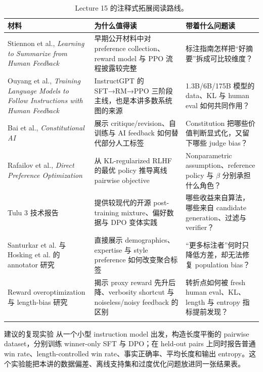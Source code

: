 \begin{longtable}{L{0.23\textwidth}L{0.31\textwidth}L{0.36\textwidth}}
\toprule
材料 & 为什么值得读 & 带着什么问题读 \\
\midrule
Stiennon et al., \emph{Learning to Summarize from Human Feedback} & 早期公开材料中对 preference collection、reward model 与 PPO 流程披露较完整 & 标注指南怎样把“好摘要”拆成可比较维度？ \\
Ouyang et al., \emph{Training Language Models to Follow Instructions with Human Feedback} & InstructGPT 的 SFT→RM→PPO 三阶段主线，也是本讲多数系统图的来源 & 1.3B/6B/175B 模型的 data、KL 与 human eval 如何共同作用？ \\
Bai et al., \emph{Constitutional AI} & 展示 critique/revision、自训练与 AI feedback 如何替代部分人工标签 & Constitution 把哪些价值判断显式化，又留下哪些 judge bias？ \\
Rafailov et al., \emph{Direct Preference Optimization} & 从 KL-regularized RLHF 的最优 policy 推导离线 pairwise objective & Nonparametric assumption、reference policy 与 $\beta$ 分别承担什么角色？ \\
Tulu 3 技术报告 & 提供较现代的开源 post-training mixture、偏好数据与 DPO 变体实践 & 哪些收益来自算法，哪些来自 candidate generation、过滤与 verifier？ \\
Santurkar et al. 与 Hosking et al. 的 annotator 研究 & 直接展示 demographics、expertise 与 style preference 如何改变聚合标签 & “更多标注者”何时只降低方差，却无法修复 population bias？ \\
Reward overoptimization 与 length-bias 研究 & 揭示 proxy reward 先升后降、verbosity shortcut 与 noiseless/noisy feedback 的区别 & 转折点如何被 fresh human eval、KL、length 与 entropy 指标提前发现？ \\
\bottomrule
\caption{Lecture 15 的注释式拓展阅读路线。}
\end{longtable}

\begin{knowledgebox}{建议的复现实验}
从一个小型 instruction model 出发，构造长度平衡的 pairwise dataset，分别训练 winner-only SFT 与 DPO；在 held-out pairs 上同时报告普通 win rate、length-controlled win rate、事实正确率、平均长度和输出 entropy。这个实验能把本讲的数据偏差、离线支持集和过度优化问题放进同一张结果表。
\end{knowledgebox}


